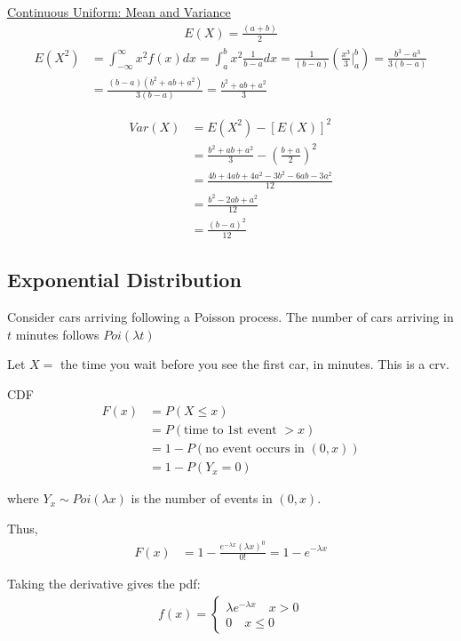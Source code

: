 \documentclass{article}
\begin{document}
\underline{Continuous Uniform: Mean and Variance}
\begin{align*}
    E(X) = \frac{(a + b)}{2}
\end{align*}
\begin{align*}
    E(X^2) &= \int_{-\infty}^{\infty}x^2f(x)dx = \int_a^b x^2 \frac{1}{b-a}dx = \frac{1}{(b-a)}\left (\frac{x^3}{3}\vert_a^b \right ) = \frac{b^3-a^3}{3(b-a)} \\
    &= \frac{(b-a)(b^2+ab+a^2)}{3(b-a)} = \frac{b^2+ab+a^2}{3}
\end{align*}

\begin{align*}
    Var(X) &= E(X^2) - [E(X)]^2 \\
    &= \frac{b^2 + ab + a^2}{3} - \left (\frac{b+a}{2}\right )^2 \\
    &= \frac{4b+4ab+4a^2-3b^2-6ab-3a^2}{12} \\
    &= \frac{b^2-2ab + a^2}{12} \\
    &= \frac{(b-a)^2}{12}
\end{align*}


\subsection{Exponential Distribution}

Consider cars arriving following a Poisson process. The number of cars arriving in $t$ minutes follows $Poi(\lambda t)$

Let $X = $ the time you wait before you see the first car, in minutes. This is a crv. 

CDF
\begin{align*}
    F(x) &= P(X \le x) \\
    &= P(\text{time to 1st event } > x) \\
    &= 1 - P(\text{no event occurs in } (0,x)) \\
    &= 1 - P(Y_x = 0)
\end{align*}

where $Y_x \sim Poi(\lambda x)$ is the number of events in $(0,x)$. 

Thus,
\begin{align*}
    F(x) &= 1 - \frac{e^{-\lambda x}(\lambda x)^0}{0!} = 1 - e^{-\lambda x}
\end{align*}

Taking the derivative gives the pdf:
\begin{align*}
    f(x) = \begin{cases}
        \lambda e^{-\lambda x} \quad x > 0 \\
        0 \quad x \le 0
    \end{cases}
\end{align*}
\end{document}
